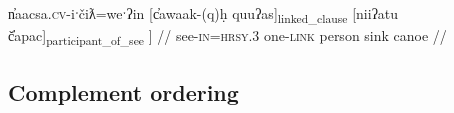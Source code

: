 \ex \label{ex:canoesink6.2}
\begingl
\gla {[}n̓aacsa.\textsc{cv}-iˑčiƛ=weˑʔin {[}c̓awaak-(q)ḥ quuʔas{]\textsubscript{linked\_clause}} {[}niiʔatu č̓apac{]\textsubscript{participant\_of\_see} ]} //
\glb see-\textsc{in}=\textsc{hrsy.3} one-\textsc{link} person sink canoe //
\endgl
\xe

\begin{comment}
ACTUALLY*2: This works quite well for showing a deictic predicate. Unfortunately it is XL so I cannot use it. Oh well!

ACTUALLY! I think the below is wrong. If you look at XL's sentence, the predicate is deictic ʔaḥʔaa, to which the linker still attaches! This would mean the only counterexample would be Adv V+link. Investigate this further.

But occasionally the linker may occur on the sole predicate in a sentence. This appears to contradict examples (\ref{ex:someonespoke}) and (\ref{ex:*someonespoke}), but the translation provided for these ``dangling" linkers always indicates they are notionally attached to the preceding sentence. I have 1 (look for more, update number) example from my corpus, involving the word \textit{qʷis} `do so'.\footnote{I am not here counting examples from \textit{tupaat} Julia Lucas, who is unique in always uses the the conjunction \textit{ʔunʔuuƛ} with a linker attached. I believe she has a different lexical entry for the word, and will explain in section.} I give one example below:

this is from Charlie Lucas, who I do not have permissions to share. Update it with a sharable example.

Context: \textit{łačiƛni wa. ʔuušciłʔap̓aƛukni nunuuk. ʔuušciłʔap̓aƛukni huyaał.} `We've let it go, haven't we? It has become hard for us to sing. It has become hard for us to dance.'

\ex \label{ex:danglinglinker}
\begingl
\glpreamble ʔaḥʔaa qʷisḥnii.//
\gla ʔaḥʔaa qʷis-(q)ḥ=niˑ //
\glb DDYN do.so-\textsc{link}=\textsc{neut.1pl} //
\glft `That's what happened to us.' //
\endgl
\xe

Although the one predicate is 

\end{comment}


\subsection{Complement ordering} \label{ch:link:participants}

